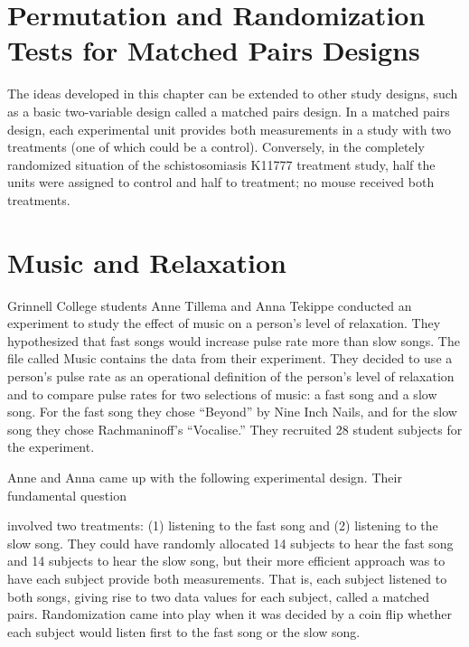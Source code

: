 \documentclass[
]{report}
\theoremstyle{definition}
\theoremstyle{definition}
\theoremstyle{definition}
\theoremstyle{definition}
\theoremstyle{remark}
\begin{document}
\hypertarget{permutation-and-randomization-tests-for-matched-pairs-designs}{%
\section{\texorpdfstring{\textbf{Permutation and Randomization Tests for Matched Pairs Designs}}{Permutation and Randomization Tests for Matched Pairs Designs}}\label{permutation-and-randomization-tests-for-matched-pairs-designs}}

The ideas developed in this chapter can be extended to other study designs, such as a basic two-variable design
called a matched pairs design. In a matched pairs design, each experimental unit provides both measurements
in a study with two treatments (one of which could be a control). Conversely, in the completely randomized
situation of the schistosomiasis K11777 treatment study, half the units were assigned to control and half to
treatment; no mouse received both treatments.

\hypertarget{music-and-relaxation}{%
\section*{Music and Relaxation}\label{music-and-relaxation}}

Grinnell College students Anne Tillema and Anna Tekippe conducted an experiment to study the effect of
music on a person's level of relaxation. They hypothesized that fast songs would increase pulse rate more
than slow songs. The file called Music contains the data from their experiment. They decided to use a person's
pulse rate as an operational definition of the person's level of relaxation and to compare pulse rates for two selections of music: a fast song and a slow song. For the fast song they chose ``Beyond'' by Nine Inch
Nails, and for the slow song they chose Rachmaninoff's ``Vocalise.'' They recruited 28 student subjects for
the experiment.

Anne and Anna came up with the following experimental design. Their fundamental question

involved two treatments: (1) listening to the fast song and (2) listening to the slow song. They could
have randomly allocated 14 subjects to hear the fast song and 14 subjects to hear the slow song, but
their more efficient approach was to have each subject provide both measurements. That is, each subject
listened to both songs, giving rise to two data values for each subject, called a matched pairs. Randomization
came into play when it was decided by a coin flip whether each subject would listen first to the
fast song or the slow song.
\end{document}
